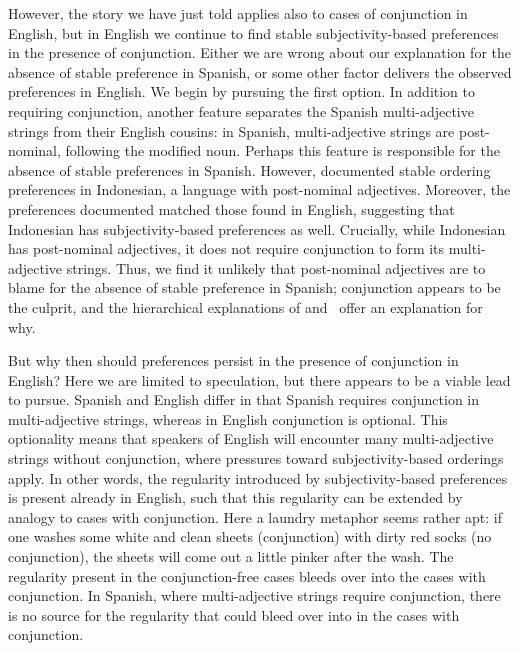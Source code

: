 \documentclass[12pt,letterpaper]{article}
\begin{document}
However, the story we have just told applies also to cases of conjunction in English, but in English we continue to find stable subjectivity-based preferences in the presence of conjunction. Either we are wrong about our explanation for the absence of stable preference in Spanish, or some other factor delivers the observed preferences in English. We begin by pursuing the first option. In addition to requiring conjunction, another feature separates the Spanish multi-adjective strings from their English cousins: in Spanish, multi-adjective strings are post-nominal, following the modified noun. Perhaps this feature is responsible for the absence of stable preferences in Spanish. However, \cite{Martin1969competence} documented stable ordering preferences in Indonesian, a language with post-nominal adjectives. Moreover, the preferences \citeauthor{Martin1969competence} documented matched those found in English, suggesting that Indonesian has subjectivity-based preferences as well. Crucially, while Indonesian has post-nominal adjectives, it does not require conjunction to form its multi-adjective strings. Thus, we find it unlikely that post-nominal adjectives are to blame for the absence of stable preference in Spanish; conjunction appears to be the culprit, and the hierarchical explanations of \citeauthor{simonic2018} and \citeauthor{scontrasetalSPadjectives}~offer an explanation for why.

But why then should preferences persist in the presence of conjunction in English? Here we are limited to speculation, but there appears to be a viable lead to pursue. Spanish and English differ in that Spanish requires conjunction in multi-adjective strings, whereas in English conjunction is optional. This optionality means that speakers of English will encounter many multi-adjective strings without conjunction, where pressures toward subjectivity-based orderings apply. In other words, the regularity introduced by subjectivity-based preferences is present already in English, such that this regularity can be extended by analogy to cases with conjunction. Here a laundry metaphor seems rather apt: if one washes some white and clean sheets (conjunction) with dirty red socks (no conjunction), the sheets will come out a little pinker after the wash. The regularity present in the conjunction-free cases bleeds over into the cases with conjunction. In Spanish, where multi-adjective strings require conjunction, there is no source for the regularity that could bleed over into in the cases with conjunction.
\end{document}
